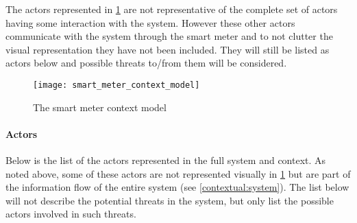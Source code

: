 The actors represented in \cref{contextual:sm_model} are not representative of the complete set of actors having some interaction with the system.
However these other actors communicate with the system through the smart meter and to not clutter the visual representation they have not been included.
They will still be listed as actors below and possible threats to/from them will be considered.

\begin{figure}[h]
  \centering
  \texttt{[image: smart\_meter\_context\_model]}
  \caption{The smart meter context model}
  \label{contextual:sm_model}
\end{figure}

\paragraph{Actors}\label{contextActors}
Below is the list of the actors represented in the full system and context.
As noted above, some of these actors are not represented visually in \cref{contextual:sm_model} but are part of the information flow of the entire system (see \cref{contextual:system}).
The list below will not describe the potential threats in the system, but only list the possible actors involved in such threats.
